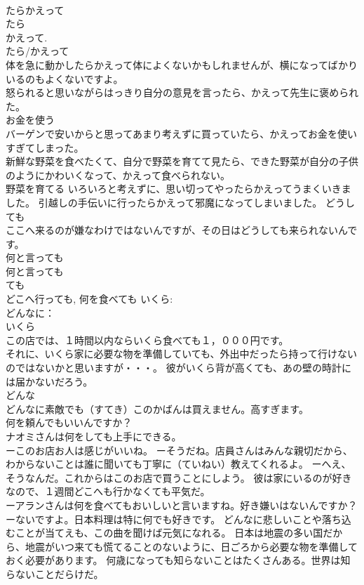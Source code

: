 \documentclass[8pt]{extreport}
\begin{document}
\begin{CJK}{UTF8}{min}
\\	たらかえって 
\\	たら 
\\	かえって. 
\\	たら/かえって 
\\	体を急に動かしたらかえって体によくないかもしれませんが、横になってばかりいるのもよくないですよ。 
\\	怒られると思いながらはっきり自分の意見を言ったら、かえって先生に褒められた。 
\\	お金を使う　　
\\	バーゲンで安いからと思ってあまり考えずに買っていたら、かえってお金を使いすぎてしまった。 
\\	新鮮な野菜を食べたくて、自分で野菜を育てて見たら、できた野菜が自分の子供のようにかわいくなって、かえって食べられない。 
\\	野菜を育てる いろいろと考えずに、思い切ってやったらかえってうまくいきました。 引越しの手伝いに行ったらかえって邪魔になってしまいました。 どうしても 
\\	ここへ来るのが嫌なわけではないんですが、その日はどうしても来られないんです。 
\\	何と言っても 
\\	何と言っても
\\	ても 
\\	どこへ行っても, 何を食べても いくら: 
\\	どんなに： 
\\	いくら 
\\	この店では、１時間以内ならいくら食べても１，０００円です。 
\\	それに、いくら家に必要な物を準備していても、外出中だったら持って行けないのではないかと思いますが・・・。 彼がいくら背が高くても、あの壁の時計には届かないだろう。 
\\	どんな 
\\	どんなに素敵でも（すてき）このかばんは買えません。高すぎます。 
\\	何を頼んでもいいんですか？ 
\\	ナオミさんは何をしても上手にできる。 
\\	ーこのお店お人は感じがいいね。 ーそうだね。店員さんはみんな親切だから、わからないことは誰に聞いても丁寧に（ていねい）教えてくれるよ。 ーへえ、そうなんだ。これからはこのお店で買うことにしよう。 彼は家にいるのが好きなので、１週間どこへも行かなくても平気だ。 
\\	ーアランさんは何を食べてもおいしいと言いますね。好き嫌いはないんですか？ ーないですよ。日本料理は特に何でも好きです。 どんなに悲しいことや落ち込むことが当てえも、この曲を聞けば元気になれる。 日本は地震の多い国だから、地震がいつ来ても慌てることのないように、日ごろから必要な物を準備しておく必要があります。 何歳になっても知らないことはたくさんある。世界は知らないことだらけだ。 

\end{CJK}
\end{document}
